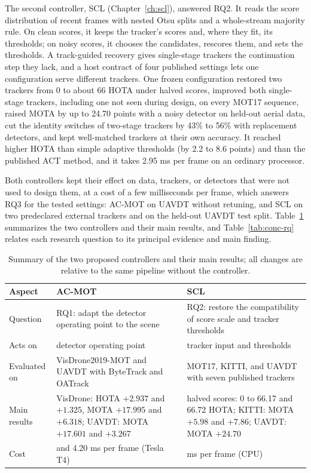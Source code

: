 The second controller, SCL (Chapter~\ref{ch:scl}), answered RQ2. It reads the score distribution of recent frames with nested Otsu splits and a whole-stream majority rule. On clean scores, it keeps the tracker's scores and, where they fit, its thresholds; on noisy scores, it chooses the candidates, rescores them, and sets the thresholds. A track-guided recovery gives single-stage trackers the continuation step they lack, and a host contract of four published settings lets one configuration serve different trackers. One frozen configuration restored two trackers from 0 to about 66 HOTA under halved scores, improved both single-stage trackers, including one not seen during design, on every MOT17 sequence, raised MOTA by up to 24.70 points with a noisy detector on held-out aerial data, cut the identity switches of two-stage trackers by 43\% to 56\% with replacement detectors, and kept well-matched trackers at their own accuracy. It reached higher HOTA than simple adaptive thresholds (by 2.2 to 8.6 points) and than the published ACT method, and it takes 2.95 ms per frame on an ordinary processor.

Both controllers kept their effect on data, trackers, or detectors that were not used to design them, at a cost of a few milliseconds per frame, which answers RQ3 for the tested settings: AC-MOT on UAVDT without retuning, and SCL on two predeclared external trackers and on the held-out UAVDT test split. Table~\ref{tab:conc-summary} summarizes the two controllers and their main results, and Table~\ref{tab:conc-rq} relates each research question to its principal evidence and main finding.

\begin{table}[tbp]
\centering
\caption{Summary of the two proposed controllers and their main results; all changes are relative to the same pipeline without the controller.}
\label{tab:conc-summary}
\begin{tabular}{>{\raggedright\arraybackslash}p{2.7cm}>{\raggedright\arraybackslash}p{5.6cm}>{\raggedright\arraybackslash}p{5.6cm}}
\toprule
Aspect & AC-MOT & SCL\\
\midrule
Question & RQ1: adapt the detector operating point to the scene & RQ2: restore the compatibility of score scale and tracker thresholds\\
Acts on & detector operating point & tracker input and thresholds\\
Evaluated on & VisDrone2019-MOT and UAVDT with ByteTrack and OATrack & MOT17, KITTI, and UAVDT with seven published trackers\\
Main results & VisDrone: HOTA $+2.937$ and $+1.325$, MOTA $+17.995$ and $+6.318$; UAVDT: MOTA $+17.601$ and $+3.267$ & halved scores: 0 to 66.17 and 66.72 HOTA; KITTI: MOTA $+5.98$ and $+7.86$; UAVDT: MOTA $+24.70$\\
Cost & 4.26 and 4.20 ms per frame (Tesla T4) & 2.95 ms per frame (CPU)\\
\bottomrule
\end{tabular}
\end{table}

